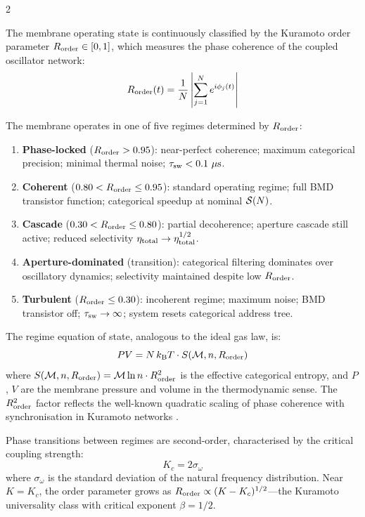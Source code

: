 \begin{multicols}{2}

The membrane operating state is continuously classified by the Kuramoto order parameter $R_{\mathrm{order}} \in [0, 1]$, which measures the phase coherence of the coupled oscillator network:
\begin{equation}
R_{\mathrm{order}}(t) = \frac{1}{N}\left|\sum_{j=1}^N e^{i\phi_j(t)}\right|
\label{eq:ch11_kuramoto}
\end{equation}

\begin{definition}
\label{def:regimes}
The membrane operates in one of five regimes determined by $R_{\mathrm{order}}$:
\begin{enumerate}
\item \textbf{Phase-locked} ($R_{\mathrm{order}} > 0.95$): near-perfect coherence; maximum categorical precision; minimal thermal noise; $\tau_{\mathrm{sw}} < 0.1\ \mu\mathrm{s}$.
\item \textbf{Coherent} ($0.80 < R_{\mathrm{order}} \leq 0.95$): standard operating regime; full BMD transistor function; categorical speedup at nominal $\mathcal{S}(N)$.
\item \textbf{Cascade} ($0.30 < R_{\mathrm{order}} \leq 0.80$): partial decoherence; aperture cascade still active; reduced selectivity $\eta_{\mathrm{total}} \to \eta_{\mathrm{total}}^{1/2}$.
\item \textbf{Aperture-dominated} (transition): categorical filtering dominates over oscillatory dynamics; selectivity maintained despite low $R_{\mathrm{order}}$.
\item \textbf{Turbulent} ($R_{\mathrm{order}} \leq 0.30$): incoherent regime; maximum noise; BMD transistor off; $\tau_{\mathrm{sw}} \to \infty$; system resets categorical address tree.
\end{enumerate}
\end{definition}

The regime equation of state, analogous to the ideal gas law, is:
\begin{equation}
PV = N\,k_{\mathrm{B}} T\cdot S(\mathcal{M}, n, R_{\mathrm{order}})
\label{eq:ch11_eos}
\end{equation}
where $S(\mathcal{M}, n, R_{\mathrm{order}}) = \mathcal{M}\ln n \cdot R_{\mathrm{order}}^2$ is the effective categorical entropy, and $P$, $V$ are the membrane pressure and volume in the thermodynamic sense. The $R_{\mathrm{order}}^2$ factor reflects the well-known quadratic scaling of phase coherence with synchronisation in Kuramoto networks \citep{kuramoto1984}.

Phase transitions between regimes are second-order, characterised by the critical coupling strength:
\begin{equation}
K_c = 2\sigma_\omega
\label{eq:ch11_kc}
\end{equation}
where $\sigma_\omega$ is the standard deviation of the natural frequency distribution. Near $K = K_c$, the order parameter grows as $R_{\mathrm{order}} \propto (K - K_c)^{1/2}$---the Kuramoto universality class with critical exponent $\beta = 1/2$.


\end{multicols}
